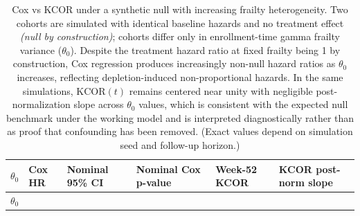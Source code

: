 \documentclass[
]{article}
\begin{document}
\begin{longtable}[]{@{}
  >{\raggedleft\arraybackslash}p{}
  >{\raggedleft\arraybackslash}p{}
  >{\raggedleft\arraybackslash}p{}
  >{\raggedleft\arraybackslash}p{}
  >{\raggedleft\arraybackslash}p{}
  >{\raggedleft\arraybackslash}p{}@{}}
\caption{Cox vs KCOR under a synthetic null with increasing frailty heterogeneity. Two cohorts are simulated with identical baseline hazards and no treatment effect \emph{(null by construction)}; cohorts differ only in enrollment-time gamma frailty variance (\(\theta_0\)). Despite the treatment hazard ratio at fixed frailty being 1 by construction, Cox regression produces increasingly non-null hazard ratios as \(\theta_0\) increases, reflecting depletion-induced non-proportional hazards. In the same simulations, \(\mathrm{KCOR}(t)\) remains centered near unity with negligible post-normalization slope across \(\theta_0\) values, which is consistent with the expected null benchmark under the working model and is interpreted diagnostically rather than as proof that confounding has been removed. (Exact values depend on simulation seed and follow-up horizon.)}\label{tbl:cox_bias_demo}\tabularnewline
\toprule\noalign{}
\begin{minipage}[b]{\linewidth}\raggedleft
\(\theta_0\)
\end{minipage} & \begin{minipage}[b]{\linewidth}\raggedleft
Cox HR
\end{minipage} & \begin{minipage}[b]{\linewidth}\raggedleft
Nominal 95\% CI
\end{minipage} & \begin{minipage}[b]{\linewidth}\raggedleft
Nominal Cox p-value
\end{minipage} & \begin{minipage}[b]{\linewidth}\raggedleft
Week-52 KCOR
\end{minipage} & \begin{minipage}[b]{\linewidth}\raggedleft
KCOR post-norm slope
\end{minipage} \\
\midrule\noalign{}
\endfirsthead
\toprule\noalign{}
\begin{minipage}[b]{\linewidth}\raggedleft
\(\theta_0\)
\end{minipage} & \begin{minipage}[b]{\linewidth}\raggedleft

\end{minipage}
\end{longtable}
\end{document}
